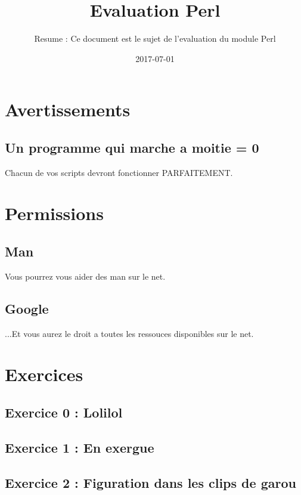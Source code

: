 \documentclass{article}
\title{Evaluation Perl}
\date{2017-07-01}
\author{Resume : Ce document est le sujet de l'evaluation du module Perl}
\begin{document}
    \maketitle
    \newpage
    \tableofcontents
    \newpage
	\section{Avertissements}
	\subsection{Un programme qui marche a moitie = 0}
	    Chacun de vos scripts devront fonctionner PARFAITEMENT.
	\subsection{}
	\section{Permissions}
	\subsection{Man}
	    Vous pourrez vous aider des man sur le net.
	\subsection{Google}
	    ...Et vous aurez le droit a toutes les ressouces disponibles sur le net.
	\newpage
	\section{Exercices}
	\subsection{Exercice 0 : Lolilol}
	\newpage
	\subsection{Exercice 1 : En exergue}
	\newpage
	\subsection{Exercice 2 : Figuration dans les clips de garou}
\end{document}
